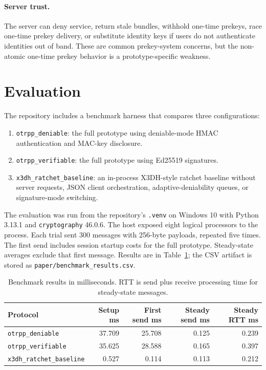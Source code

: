 \documentclass[11pt]{article}
\begin{document}
\paragraph{Server trust.}
The server can deny service, return stale bundles, withhold one-time prekeys, race one-time prekey delivery, or substitute identity keys if users do not authenticate identities out of band. These are common prekey-system concerns, but the non-atomic one-time prekey behavior is a prototype-specific weakness.

\section{Evaluation}
\label{sec:evaluation}

The repository includes a benchmark harness that compares three configurations:
\begin{enumerate}
  \item \texttt{otrpp\_deniable}: the full prototype using deniable-mode HMAC authentication and MAC-key disclosure.
  \item \texttt{otrpp\_verifiable}: the full prototype using Ed25519 signatures.
  \item \texttt{x3dh\_ratchet\_baseline}: an in-process X3DH-style ratchet baseline without server requests, JSON client orchestration, adaptive-deniability queues, or signature-mode switching.
\end{enumerate}

The evaluation was run from the repository's \texttt{.venv} on Windows 10 with Python 3.13.1 and \texttt{cryptography} 46.0.6. The host exposed eight logical processors to the process. Each trial sent 300 messages with 256-byte payloads, repeated five times. The first send includes session startup costs for the full prototype. Steady-state averages exclude that first message. Results are in Table~\ref{tab:benchmark}; the CSV artifact is stored as \texttt{paper/benchmark\_results.csv}.

\begin{table}[t]
\centering
\begin{tabular}{@{}lrrrr@{}}
\toprule
Protocol & Setup ms & First send ms & Steady send ms & Steady RTT ms \\
\midrule
\texttt{otrpp\_deniable} & 37.709 & 25.708 & 0.125 & 0.239 \\
\texttt{otrpp\_verifiable} & 35.625 & 28.588 & 0.165 & 0.397 \\
\texttt{x3dh\_ratchet\_baseline} & 0.527 & 0.114 & 0.113 & 0.212 \\
\bottomrule
\end{tabular}
\caption{Benchmark results in milliseconds. RTT is send plus receive processing time for steady-state messages.}
\label{tab:benchmark}
\end{table}
\end{document}
